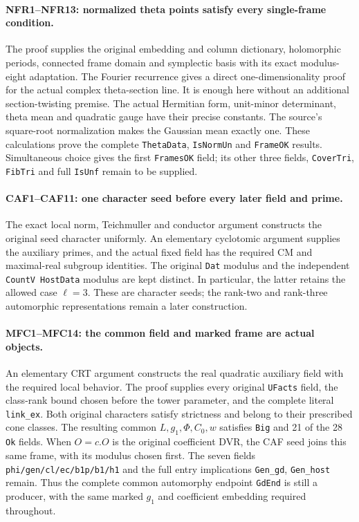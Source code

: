 \paragraph{NFR1--NFR13: normalized theta points satisfy every single-frame condition.}
The proof supplies the original embedding and column dictionary,
holomorphic periods, connected frame domain and symplectic basis with
its exact modulus-eight adaptation. The Fourier recurrence gives a
direct one-dimensionality proof for the actual complex theta-section
line. It is enough here without an additional section-twisting premise.
The actual Hermitian form, unit-minor determinant, theta mean and
quadratic gauge have their precise constants. The source's square-root
normalization makes the Gaussian mean exactly one. These calculations
prove the complete \texttt{ThetaData}, \texttt{IsNormUn} and
\texttt{FrameOK} results. Simultaneous choice gives the first
\texttt{FramesOK} field; its other three fields, \texttt{CoverTri},
\texttt{FibTri} and full \texttt{IsUnf} remain to be supplied.

\paragraph{CAF1--CAF11: one character seed before every later field and prime.}
The exact local norm, Teichmuller and conductor argument constructs the
original seed character uniformly. An elementary cyclotomic argument
supplies the auxiliary primes, and the actual fixed field has the
required CM and maximal-real subgroup identities. The original
\texttt{Dat} modulus and the independent \texttt{CountV HostData}
modulus are kept distinct. In particular, the latter retains the
allowed case $\ell=3$. These are character seeds; the rank-two and
rank-three automorphic representations remain a later construction.

\paragraph{MFC1--MFC14: the common field and marked frame are actual objects.}
An elementary CRT argument constructs the real quadratic auxiliary field
with the required local behavior. The proof supplies every original
\texttt{UFacts} field, the class-rank bound chosen before the tower
parameter, and the complete literal \texttt{link\_ex}. Both original
characters satisfy strictness and belong to their prescribed cone
classes. The resulting common $L,g_1,\Phi,C_0,w$ satisfies
\texttt{Big} and 21 of the 28 \texttt{Ok} fields. When $O=c.O$ is
the original coefficient DVR, the CAF seed joins this same frame,
with its modulus chosen first.
The seven fields \texttt{phi/gen/cl/ec/b1p/b1/h1} and the full entry
implications \texttt{Gen\_gd}, \texttt{Gen\_host} remain. Thus
the complete common automorphy endpoint \texttt{GdEnd} is still a
producer, with the same marked $g_1$ and coefficient embedding required
throughout.


